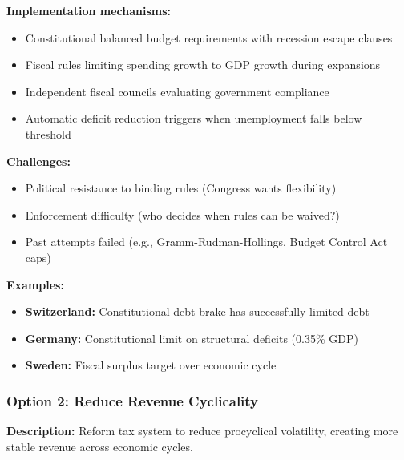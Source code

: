 \documentclass[12pt,letterpaper]{article}
\begin{document}
\textbf{Implementation mechanisms:}
\begin{itemize}
    \item Constitutional balanced budget requirements with recession escape clauses
    \item Fiscal rules limiting spending growth to GDP growth during expansions
    \item Independent fiscal councils evaluating government compliance
    \item Automatic deficit reduction triggers when unemployment falls below threshold
\end{itemize}

\textbf{Challenges:}
\begin{itemize}
    \item Political resistance to binding rules (Congress wants flexibility)
    \item Enforcement difficulty (who decides when rules can be waived?)
    \item Past attempts failed (e.g., Gramm-Rudman-Hollings, Budget Control Act caps)
\end{itemize}

\textbf{Examples:}
\begin{itemize}
    \item \textbf{Switzerland:} Constitutional debt brake has successfully limited debt
    \item \textbf{Germany:} Constitutional limit on structural deficits (0.35\% GDP)
    \item \textbf{Sweden:} Fiscal surplus target over economic cycle
\end{itemize}

\subsubsection{Option 2: Reduce Revenue Cyclicality}

\textbf{Description:} Reform tax system to reduce procyclical volatility, creating more stable revenue across economic cycles.
\end{document}
